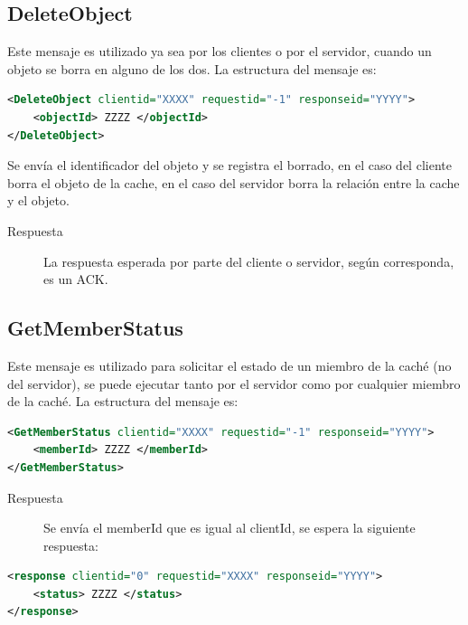 \subsection{DeleteObject}
Este mensaje es utilizado ya sea por los clientes o por el servidor, cuando un objeto se borra en alguno de los dos. La estructura del mensaje es:

\begin{lstlisting}[language=XML,caption=Mensaje de DeleteObject]
<DeleteObject clientid="XXXX" requestid="-1" responseid="YYYY"> 
	<objectId> ZZZZ </objectId>
</DeleteObject>
\end{lstlisting}

Se envía el identificador del objeto y se registra el borrado, en el caso del cliente borra el objeto de la cache, en el caso del servidor borra la relación entre la cache y el objeto.

\begin{description}
\item[Respuesta] La respuesta esperada por parte del cliente o servidor, según corresponda, es un ACK.
\end{description}

\subsection{GetMemberStatus}
\label{GetMemberStatus} 
Este mensaje es utilizado para solicitar el estado de un miembro de la caché (no del servidor), se puede ejecutar tanto por el servidor como por cualquier miembro de la caché. La estructura del mensaje es:

\begin{lstlisting}[language=XML,caption=Mensaje de GetMemberStatus]
<GetMemberStatus clientid="XXXX" requestid="-1" responseid="YYYY"> 
	<memberId> ZZZZ </memberId>
</GetMemberStatus>
\end{lstlisting}

\begin{description}
\item[Respuesta] Se envía el memberId que es igual al clientId, se espera la siguiente respuesta:
\end{description}

\begin{lstlisting}[language=XML,caption=Mensaje de Respuesta de GetMemberStatus]
<response clientid="0" requestid="XXXX" responseid="YYYY"> 
	<status> ZZZZ </status>
</response>
\end{lstlisting}

